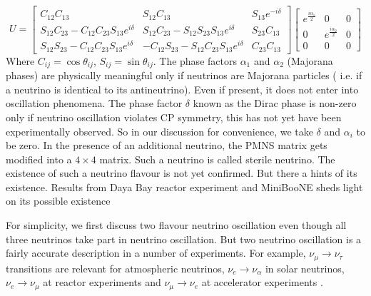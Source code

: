 \documentclass[12pt,a4paper]{report}
\begin{document}
\begin{equation}
\label{eq:0c}
U = \begin{bmatrix} C_{12}C_{13} & S_{12}C_{13} & S_{13}e^{-i\delta} \\
S_{12}C_{23}-C_{12}C_{23}S_{13}e^{i\delta} & S_{12}C_{23}-S_{12}S_{23}S_{13}e^{i\delta}& S_{23}C_{13}\\
S_{12}S_{23}-C_{12}C_{23}S_{13}e^{i\delta}& -C_{12}S_{23}-S_{12}C_{23}S_{13}e^{i\delta}&C_{23}C_{13} \end{bmatrix} \begin{bmatrix}
e^{\frac{i\alpha_{1}}{2}}&0&0\\0& e^{\frac{i\alpha_{2}}{2}}&0\\0&0&0\end{bmatrix}
\end{equation}
Where $C_{ij}=\cos\theta_{ij}$, $S_{ij}=\sin\theta_{ij}$. The phase factors $\alpha_{1}$ and $\alpha_{2}$ (Majorana phases) are physically meaningful only if neutrinos are Majorana particles ( i.e. if a neutrino is identical to its antineutrino). Even if present, it does not enter into oscillation phenomena. The phase factor $\delta$ known as the Dirac phase is non-zero only if neutrino oscillation violates CP symmetry, this has not yet have been experimentally observed. So in our discussion for convenience, we take $\delta$ and $\alpha_{i}$ to be zero. In the presence of an additional neutrino, the PMNS matrix gets modified into a $4\times4$ matrix. Such a neutrino is called sterile neutrino. The existence of such a neutrino flavour is not yet confirmed. But there a hints of its existence. Results from Daya Bay reactor experiment and MiniBooNE sheds light on its possible existence \cite{daya}\cite{mini}\par

For simplicity, we first discuss two flavour neutrino oscillation even though all three neutrinos take part in neutrino oscillation. But two neutrino oscillation is a fairly accurate description in a number of experiments. For example, $\nu_{\mu} \rightarrow \nu_{\tau}$ transitions are relevant for atmospheric neutrinos, $\nu_{e}\rightarrow \nu_{\alpha}$ in solar neutrinos, $\nu_{e}\rightarrow\nu_{\mu}$  at reactor experiments and $\nu_{\mu}\rightarrow\nu_{e}$ at accelerator experiments \cite{blasone2009}.\par
\end{document}

